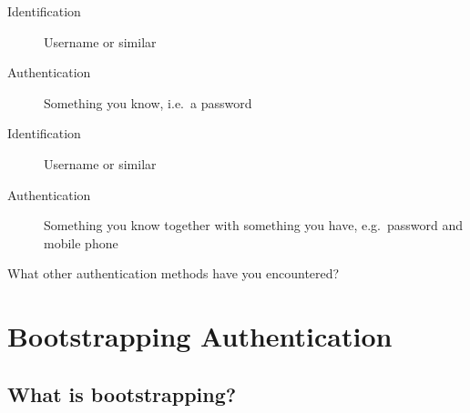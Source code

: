\begin{frame}
  \begin{example}
    \begin{description}
      \item[Identification] Username or similar
      \item[Authentication] Something you know, i.e.\ a password
    \end{description}
  \end{example}

  \pause{}

  \begin{example}
    \begin{description}
      \item[Identification] Username or similar
      \item[Authentication] Something you know together with something you 
        have, e.g.\ password and mobile phone
    \end{description}
  \end{example}
\end{frame}

\begin{frame}
  \begin{exercise}
    What other authentication methods have you encountered?
  \end{exercise}
\end{frame}


\section[Bootstrapping]{Bootstrapping Authentication}

\subsection{What is bootstrapping?}

